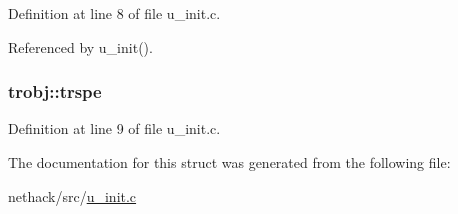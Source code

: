 Definition at line 8 of file u\+\_\+init.\+c.



Referenced by u\+\_\+init().

\hypertarget{structtrobj_a7faa17ba21618ea077821199e4d3411d}{
\subsubsection[{trspe}]{ trobj\+::trspe}}\label{structtrobj_a7faa17ba21618ea077821199e4d3411d}


Definition at line 9 of file u\+\_\+init.\+c.



The documentation for this struct was generated from the following file\+:\begin{DoxyCompactItemize}
\item 
nethack/src/\hyperlink{u__init_8c}{u\+\_\+init.\+c}\end{DoxyCompactItemize}
